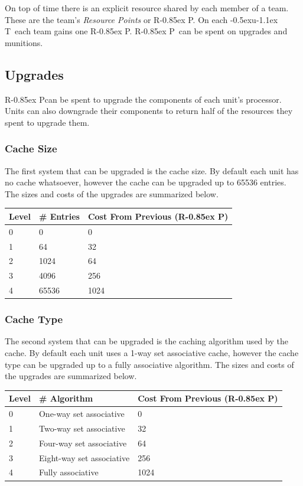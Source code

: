 \documentclass{article}
\newcommand{\UT}{\lower-0.5ex\hbox{u}\kern-1.1ex T}
\newcommand{\RP}{R\kern-0.85ex P}
\begin{document}
On top of time there is an explicit resource shared by each member of a team.
These are the team's \textit{Resource Points} or \RP. On each \UT\ each team
gains one \RP. \RP\ can be spent on upgrades and munitions.

\subsection{Upgrades}

\RP can be spent to upgrade the components of each unit's processor. Units can
also downgrade their components to return half of the resources they spent to
upgrade them.

\subsubsection{Cache Size}

The first system that can be upgraded is the cache size. By default each unit
has no cache whatsoever, however the cache can be upgraded up to 65536 entries.
The sizes and costs of the upgrades are summarized below.

\begin{minipage}{\textwidth}
\centering
\begin{tabular}{lll}
    \hline Level & \# Entries & Cost From Previous (\RP) \\ \hline
    0 & 0 & 0 \\
    1 & 64 & 32 \\
    2 & 1024 & 64 \\
    3 & 4096 & 256 \\
    4 & 65536 & 1024 \\
\end{tabular}
\end{minipage}

\subsubsection{Cache Type}

The second system that can be upgraded is the caching algorithm used by the
cache. By default each unit uses a 1-way set associative cache, however the
cache type can be upgraded up to a fully associative algorithm. The sizes and
costs of the upgrades are summarized below.

\begin{minipage}{\textwidth}
\centering
\begin{tabular}{lll}
    \hline Level & \# Algorithm & Cost From Previous (\RP) \\ \hline
    0 & One-way set associative & 0 \\
    1 & Two-way set associative & 32 \\
    2 & Four-way set associative & 64 \\
    3 & Eight-way set associative & 256 \\
    4 & Fully associative & 1024 \\
\end{tabular}
\end{minipage}
\end{document}
